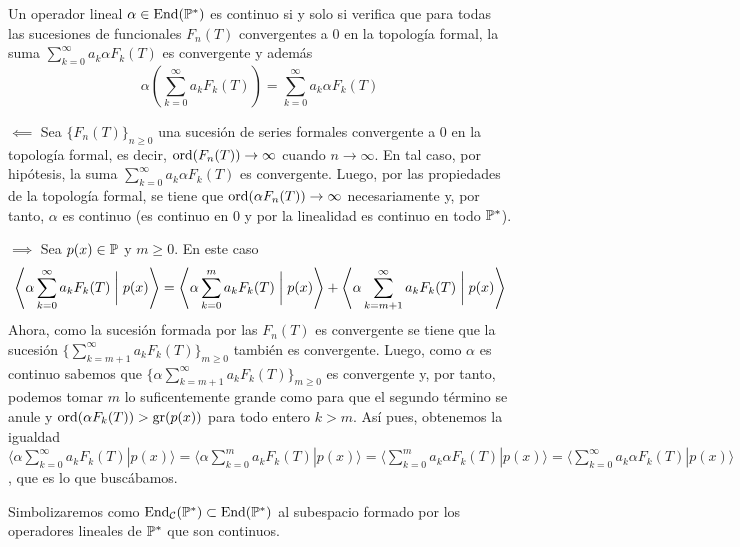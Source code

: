 \begin{teorema} \label{equivalencia continuidad}
    Un operador lineal $\alpha \in \operatorname*{End}(\mathbb{P}^*)$ es continuo si y solo si verifica que para todas las sucesiones de funcionales $F_n(T)$ convergentes a 0 en la topología formal, la suma $\sum_{k=0}^\infty a_k \alpha F_k(T)$ es convergente y además
    \begin{equation*}
        \alpha \left( \sum_{k=0}^\infty a_k F_k(T) \right) = \sum_{k=0}^\infty a_k \alpha F_k(T)
    \end{equation*} 
    
\end{teorema}
\begin{demo}
    $\boxed{\impliedby}$ Sea $\{F_n(T)\}_{n \geq 0}$ una sucesión de series formales convergente a 0 en la topología formal, es decir, $\operatorname*{ord}(F_n(T)) \rightarrow \infty$ cuando $n \rightarrow \infty$. En tal caso, por hipótesis, la suma $\sum_{k=0}^\infty a_k \alpha F_k(T)$ es convergente. Luego, por las propiedades de la topología formal, se tiene que $\operatorname*{ord}(\alpha F_n(T)) \rightarrow \infty$ necesariamente y, por tanto, $\alpha$ es continuo (es continuo en 0 y por la linealidad es continuo en todo $\mathbb{P}^*$).

    $\boxed{\implies}$ Sea $p(x) \in \mathbb{P}$ y $m \geq 0$. En este caso
    \begin{equation*}
        \left\langle \alpha \sum_{k=0}^\infty a_k F_k(T) \biggm| p(x) \right\rangle = \left\langle \alpha \sum_{k=0}^m a_k F_k(T) \biggm| p(x) \right\rangle + \left\langle \alpha \sum_{k=m+1}^\infty a_k F_k(T) \biggm| p(x) \right\rangle
    \end{equation*}
    Ahora, como la sucesión formada por las $F_n(T)$ es convergente se tiene que la sucesión $\{\sum_{k=m+1}^\infty a_k F_k(T)\}_{m \geq 0}$ también es convergente. Luego, como $\alpha$ es continuo sabemos que $\{ \alpha \sum_{k=m+1}^\infty a_k F_k(T)\}_{m \geq 0}$ es convergente y, por tanto, podemos tomar $m$ lo suficentemente grande como para que el segundo término se anule y $\operatorname*{ord}(\alpha F_k(T)) > \operatorname{gr}(p(x))$ para todo entero $k > m$. Así pues, obtenemos la igualdad $\langle \alpha \sum_{k=0}^\infty a_k F_k(T) | p(x) \rangle = \langle \alpha \sum_{k=0}^m a_k F_k(T) | p(x) \rangle = \langle \sum_{k=0}^m a_k \alpha F_k(T) | p(x) \rangle = \langle \sum_{k=0}^\infty a_k \alpha F_k(T) | p(x) \rangle$, que es lo que buscábamos.
\end{demo}

\begin{obs}
    Simbolizaremos como $\operatorname*{End}_{\mathcal{C}}(\mathbb{P}^*) \subset \operatorname*{End}(\mathbb{P}^*)$ al subespacio formado por los operadores lineales de $\mathbb{P}^*$ que son continuos. 
\end{obs}

